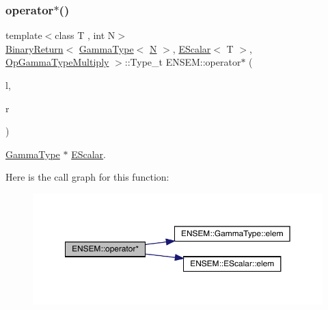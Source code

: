 \subsubsection{\texorpdfstring{operator$\ast$()}{operator*()}\hspace{0.1cm}{\footnotesize\ttfamily [4/9]}}
{\footnotesize\ttfamily template$<$class T , int N$>$ \\
\mbox{\hyperlink{structENSEM_1_1BinaryReturn}{Binary\+Return}}$<$ \mbox{\hyperlink{classENSEM_1_1GammaType}{Gamma\+Type}}$<$ \mbox{\hyperlink{adat__devel_2lib_2hadron_2operator__name__util_8cc_a7722c8ecbb62d99aee7ce68b1752f337}{N}} $>$, \mbox{\hyperlink{classENSEM_1_1EScalar}{E\+Scalar}}$<$ T $>$, \mbox{\hyperlink{structENSEM_1_1OpGammaTypeMultiply}{Op\+Gamma\+Type\+Multiply}} $>$\+::Type\+\_\+t E\+N\+S\+E\+M\+::operator$\ast$ (\begin{DoxyParamCaption}\item[{const \mbox{\hyperlink{classENSEM_1_1GammaType}{Gamma\+Type}}$<$ \mbox{\hyperlink{adat__devel_2lib_2hadron_2operator__name__util_8cc_a7722c8ecbb62d99aee7ce68b1752f337}{N}} $>$ \&}]{l,  }\item[{const \mbox{\hyperlink{classENSEM_1_1EScalar}{E\+Scalar}}$<$ T $>$ \&}]{r }\end{DoxyParamCaption})\hspace{0.3cm}{\ttfamily [inline]}}



\mbox{\hyperlink{classENSEM_1_1GammaType}{Gamma\+Type}} $\ast$ \mbox{\hyperlink{classENSEM_1_1EScalar}{E\+Scalar}}. 

Here is the call graph for this function\+:
\nopagebreak
\begin{figure}[H]
\begin{center}
\leavevmode
\includegraphics[width=350pt]{d4/dca/group__escalar_ga53bf11728d0f1f7fb9dea51cd221792d_cgraph}
\end{center}
\end{figure}
\mbox{\label{group__escalar_gacd3a5ba72921d671ee94910188b8c179}} 
